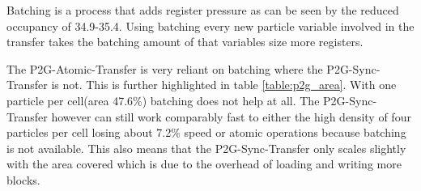 \documentclass[m,times]{cgMA}
\begin{document}
Batching is a process that adds register pressure as can be seen by the reduced occupancy of 34.9-35.4. Using batching every new particle variable involved in the transfer takes the batching amount of that variables size more registers.

The P2G-Atomic-Transfer is very reliant on batching where the P2G-Sync-Transfer is not. This is further highlighted in table \ref{table:p2g_area}. With one particle per cell(area 47.6\%) batching does not help at all. The P2G-Sync-Transfer however can still work comparably fast to either the high density of four particles per cell losing about 7.2\% speed or atomic operations because batching is not available. This also means that the P2G-Sync-Transfer only scales slightly with the area covered which is due to the overhead of loading and writing more blocks.
\end{document}
